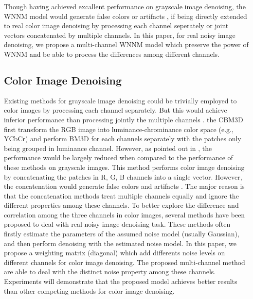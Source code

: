 \documentclass[10pt,twocolumn,letterpaper,sort&compress]{article}
\begin{document}
Though having achieved excallent performance on grayscale image denoising, the WNNM model would generate false colors or artifacts \cite{mairal2008sparse}, if being directly extended to real color image denoising by processing each channel seperately or joint vectors concatenated by multiple channels. In this paper, for real noisy image denoising, we propose a multi-channel WNNM model which preserve the power of WNNM and be able to process the differences among different channels.

\subsection{Color Image Denoising}
Existing methods \cite{nlm,ksvd,bm3d,epll,lssc,wnnm,pgpd,mlp,csf,chen2015learning} for grayscale image denoising could be trivially employed to color images by processing each channel separately. But this would achieve inferior performance than processing  jointly the multiple channels \cite{mairal2008sparse}. the CBM3D \cite{cbm3d} first transform the RGB image into luminance-chrominance color space (e.g., YCbCr) and perform BM3D \cite{bm3d} for each channels separately with the patches only being grouped in luminance channel. However, as pointed out in \cite{mairal2008sparse}, the performance would be largely reduced when compared to the performance of these methods on grayscale images. 
This method \cite{mairal2008sparse} performs color image denoising by concatenating the patches in R, G, B channels into a single vector. However, the concatenation would generate false colors and artifacts \cite{mairal2008sparse}. The major reason is that the concatenation methods treat multiple channels equally and ignore the different properties among these channels. To better explore the difference and correlation among the three channels in color images, several methods \cite{crosschannel2016,Liu2008,almapg,Zhu_2016_CVPR,noiseclinic,ncwebsite,neatimage} have been proposed to deal with real noisy image denoising task. These methods often firstly estimate the parameters of the assumed noise model (usually Gaussian), and then perform denoising with the estimated noise model. In this paper, we propose a weighting matrix (diagonal) which add differents noise levels on different channels for color image denoising. The proposed multi-channel method are able to deal with the distinct noise property among these channels. Experiments will demonstrate that the proposed model achieves better results than other competing methods for color image denoising.
\end{document}
